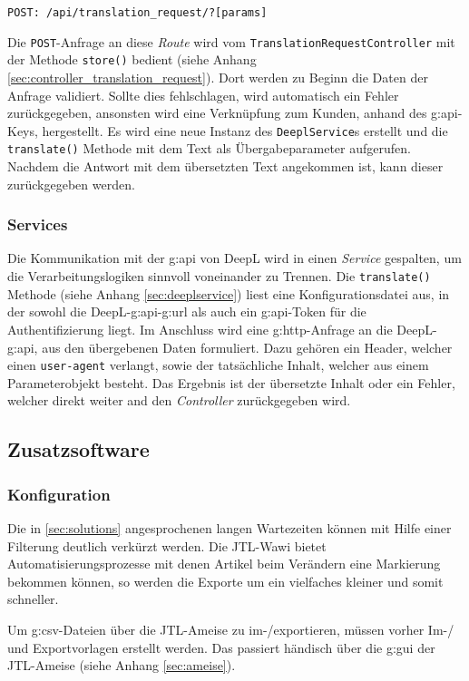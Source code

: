 \texttt{POST: /api/translation\_request/?[params]}


Die \texttt{POST}-Anfrage an diese \emph{Route} wird vom \texttt{TranslationRequestController} mit der Methode \texttt{store()} bedient (siehe Anhang \ref{sec:controller_translation_request}).
Dort werden zu Beginn die Daten der Anfrage validiert. 
Sollte dies fehlschlagen, wird automatisch ein Fehler zurückgegeben, ansonsten wird eine Verknüpfung zum Kunden, anhand des \gls{g:api}-Keys, hergestellt. 
Es wird eine neue Instanz des \texttt{DeeplService}s erstellt und die \texttt{translate()} Methode mit dem Text als Übergabeparameter aufgerufen.
Nachdem die Antwort mit dem übersetzten Text angekommen ist, kann dieser zurückgegeben werden.

\subsubsection{Services}
Die Kommunikation mit der \gls{g:api} von DeepL wird in einen \emph{Service} gespalten, um die Verarbeitungslogiken sinnvoll voneinander zu Trennen.
Die \texttt{translate()} Methode (siehe Anhang \ref{sec:deeplservice}) liest eine Konfigurationsdatei aus, in der sowohl die DeepL-\gls{g:api}-\gls{g:url} als auch ein \gls{g:api}-Token für die Authentifizierung liegt.
Im Anschluss wird eine \gls{g:http}-Anfrage an die DeepL-\gls{g:api}, aus den übergebenen Daten formuliert.
Dazu gehören ein Header, welcher einen \texttt{user-agent} verlangt, sowie der tatsächliche Inhalt, welcher aus einem Parameterobjekt besteht.
Das Ergebnis ist der übersetzte Inhalt oder ein Fehler, welcher direkt weiter and den \emph{Controller} zurückgegeben wird.


\subsection{Zusatzsoftware}

\subsubsection{Konfiguration}
Die in \ref{sec:solutions} angesprochenen langen Wartezeiten können mit Hilfe einer Filterung deutlich verkürzt werden. 
Die JTL-Wawi bietet Automatisierungsprozesse mit denen Artikel beim Verändern eine Markierung bekommen können, so werden die Exporte um ein vielfaches kleiner und somit schneller.

Um \gls{g:csv}-Dateien über die JTL-Ameise zu im-/exportieren, müssen vorher Im-/ und Exportvorlagen erstellt werden.
Das passiert händisch über die \gls{g:gui} der JTL-Ameise (siehe Anhang \ref{sec:ameise}).

